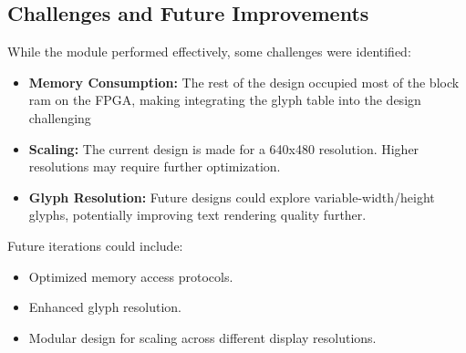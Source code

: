\documentclass{subfile}
\begin{document}
  \subsection{Challenges and Future Improvements}
  While the module performed effectively, some challenges were identified:
  \begin{itemize}
      \item \textbf{Memory Consumption:} The rest of the design occupied most of the block 
        ram on the FPGA, making integrating the glyph table into the design challenging
      \item \textbf{Scaling:} The current design is made for a 640x480 resolution. Higher resolutions may require further optimization.
      \item \textbf{Glyph Resolution:} Future designs could explore variable-width/height glyphs, potentially improving text rendering quality further.
  \end{itemize}

  Future iterations could include:
  \begin{itemize}
      \item Optimized memory access protocols.
      \item Enhanced glyph resolution.
      \item Modular design for scaling across different display resolutions.
  \end{itemize}

\end{document}
